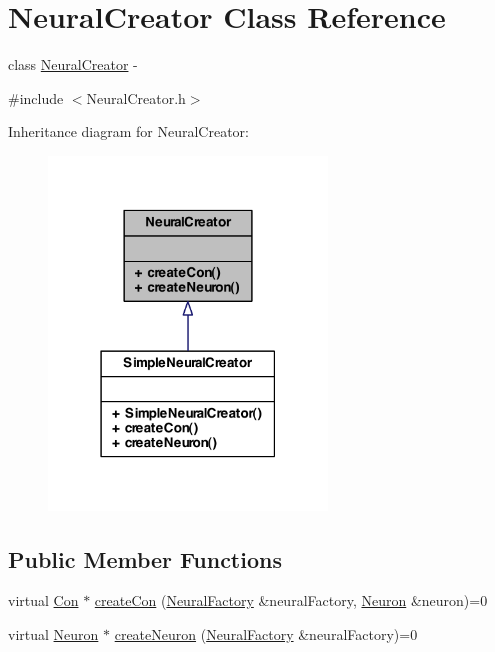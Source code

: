\hypertarget{class_neural_creator}{
\section{NeuralCreator Class Reference}
\label{class_neural_creator}
}


class \hyperlink{class_neural_creator}{NeuralCreator} -\/  




{\ttfamily \#include $<$NeuralCreator.h$>$}



Inheritance diagram for NeuralCreator:\nopagebreak
\begin{figure}[H]
\begin{center}
\leavevmode
\includegraphics[width=210pt]{class_neural_creator__inherit__graph}
\end{center}
\end{figure}
\subsection*{Public Member Functions}
\begin{DoxyCompactItemize}
\item 
virtual \hyperlink{class_con}{Con} $\ast$ \hyperlink{class_neural_creator_aa493bedc52c2988c404f62c61790358d}{createCon} (\hyperlink{class_neural_factory}{NeuralFactory} \&neuralFactory, \hyperlink{class_neuron}{Neuron} \&neuron)=0
\item 
virtual \hyperlink{class_neuron}{Neuron} $\ast$ \hyperlink{class_neural_creator_a1963031f6a1b3ba77ff6a23708790b51}{createNeuron} (\hyperlink{class_neural_factory}{NeuralFactory} \&neuralFactory)=0
\end{DoxyCompactItemize}


